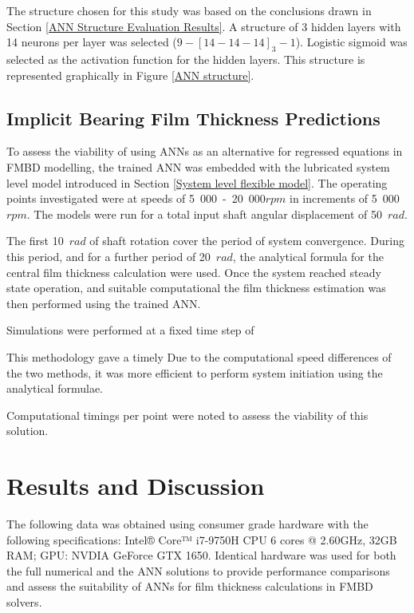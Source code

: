 The structure chosen for this study was based on the conclusions drawn in Section \ref{ANN Structure Evaluation Results}. A structure of 3 hidden layers with 14 neurons per layer was selected ($9-[14-14-14]_3-1$). Logistic sigmoid was selected as the activation function for the hidden layers. This structure is represented graphically in Figure \ref{ANN structure}.


\subsection{Implicit Bearing Film Thickness Predictions}

To assess the viability of using ANNs as an alternative for regressed equations in FMBD modelling, the trained ANN was embedded with the lubricated system level model introduced in Section \ref{System level flexible model}. The operating points investigated were at speeds of 5~000~-~20~000$rpm$ in increments of 5~000~$rpm$. The models were run for a total input shaft angular displacement of 50~$rad$.

The first 10~$rad$ of shaft rotation cover the period of system convergence. During this period, and for a further period of 20~$rad$, the analytical formula for the central film thickness calculation were used. Once the system reached steady state operation, and suitable computational the film thickness estimation was then performed using the trained ANN. 

Simulations were performed at a fixed time step of 

This methodology gave a timely 
Due to the computational speed differences of the two methods, it was more efficient to perform system initiation using the analytical formulae.

Computational timings per point were noted to assess the viability of this solution.


\section{Results and Discussion}

The following data was obtained using consumer grade hardware with the following specifications: 
Intel® Core™ i7-9750H CPU 6 cores @ 2.60GHz, 32GB RAM; GPU: NVDIA GeForce GTX 1650. Identical hardware was used for both the full numerical and the ANN solutions to provide performance comparisons and assess the suitability of ANNs for film thickness calculations in FMBD solvers.

